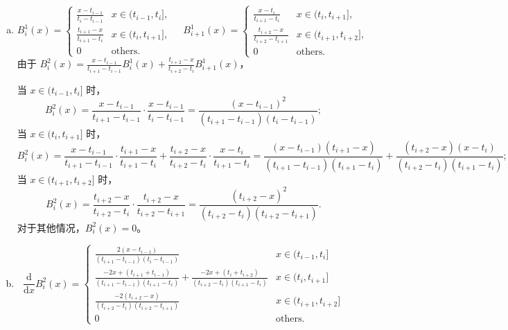 \documentclass[lang=cn,a4paper,newtx,bibend=bibtex]{elegantpaper}
\begin{document}
\begin{solution}~~%

  \begin{enumerate}[(a)]
    \item
    \begin{equation*}
      B_i^1(x)=\begin{cases}
        \frac{x-t_{i-1}}{t_i-t_{i-1}} & x\in(t_{i-1},t_i],\\
        \frac{t_{i+1}-x}{t_{i+1}-t_i} & x\in(t_i,t_{i+1}],\\
        0 & \text{others}.
      \end{cases}
      ~~~~~
      B_{i+1}^1(x)=\begin{cases}
        \frac{x-t_{i}}{t_{i+1}-t_{i}} & x\in(t_{i},t_{i+1}],\\
        \frac{t_{i+2}-x}{t_{i+2}-t_{i+1}} & x\in(t_{i+1},t_{i+2}],\\
        0 & \text{others}.
      \end{cases}
    \end{equation*}
    由于 $B_i^2(x)=\frac{x-t_{i-1}}{t_{i+1}-t_{i-1}}B_i^1(x)+\frac{t_{i+2}-x}{t_{i+2}-t_{i}}B_{i+1}^1(x)$，
    
    当 $x\in(t_{i-1},t_i]$ 时，
    \[
      B_i^2(x)=\frac{x-t_{i-1}}{t_{i+1}-t_{i-1}}\cdot \frac{x-t_{i-1}}{t_i-t_{i-1}} = \frac{(x-t_{i-1})^2}{(t_{i+1}-t_{i-1})(t_i-t_{i-1})};
    \]
    当 $x\in(t_{i},t_{i+1}]$ 时，
    \[
      B_i^2(x)=\frac{x-t_{i-1}}{t_{i+1}-t_{i-1}}\cdot \frac{t_{i+1}-x}{t_{i+1}-t_i} + \frac{t_{i+2}-x}{t_{i+2}-t_i}\cdot \frac{x - t_i}{t_{i+1}-t_i} = \frac{(x-t_{i-1})(t_{i+1}-x)}{(t_{i+1}-t_{i-1})(t_{i+1}-t_i)}+\frac{(t_{i+2}-x)(x-t_i)}{(t_{i+2}-t_{i})(t_{i+1}-t_{i})};
    \]
    当 $x\in(t_{i+1},t_{i+2}]$ 时，
    \[
      B_i^2(x) = \frac{t_{i+2}-x}{t_{i+2}-t_i}\cdot \frac{t_{i+2}-x}{t_{i+2}-t_{i+1}} = \frac{(t_{i+2}-x)^2}{(t_{i+2}-t_{i})(t_{i+2}-t_{i+1})}.
    \]
    对于其他情况，$B_i^2(x) = 0$。

    \item
    \[
      \frac{\mathrm{d}}{\mathrm{d}x} B_i^2(x) = \begin{cases}
        \frac{2(x-t_{i-1})}{(t_{i+1}-t_{i-1})(t_i-t_{i-1})} & x\in(t_{i-1},t_i]\\
        \frac{-2x+(t_{i+1}+t_{i-1})}{(t_{i+1}-t_{i-1})(t_{i+1}-t_i)}+\frac{-2x+(t_i+t_{i+2})}{(t_{i+2}-t_{i})(t_{i+1}-t_{i})} & x\in(t_i,t_{i+1}]\\
        \frac{-2(t_{i+2}-x)}{(t_{i+2}-t_{i})(t_{i+2}-t_{i+1})} & x\in(t_{i+1},t_{i+2}]\\
        0 & \text{others}.
      \end{cases}
    \]


\end{enumerate}
\end{solution}
\end{document}
